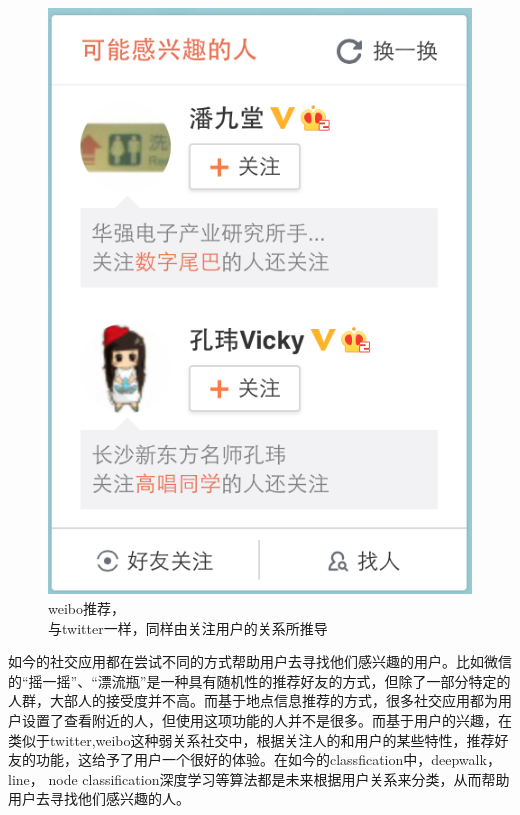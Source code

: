 \begin{figure}[h]
\begin{minipage}[t]{0.45\linewidth}
\includegraphics[width=\textwidth]{img/chap1/weibo_recommend.png}
\caption{weibo推荐，\\与twitter一样，同样由关注用户的关系所推导\label{weibo推荐，}}
\end{minipage}

\end{figure}

如今的社交应用都在尝试不同的方式帮助用户去寻找他们感兴趣的用户。比如微信的“摇一摇”、“漂流瓶”是一种具有随机性的推荐好友的方式，但除了一部分特定的人群，大部人的接受度并不高。而基于地点信息推荐的方式，很多社交应用都为用户设置了查看附近的人，但使用这项功能的人并不是很多。而基于用户的兴趣，在类似于twitter,weibo这种弱关系社交中，根据关注人的和用户的某些特性，推荐好友的功能，这给予了用户一个很好的体验。在如今的classfication中，deepwalk\parencite{deepwalk}，line\parencite{node1}， node classification\parencite{node}深度学习\parencite{deep}等算法都是未来根据用户关系来分类，从而帮助用户去寻找他们感兴趣的人。


